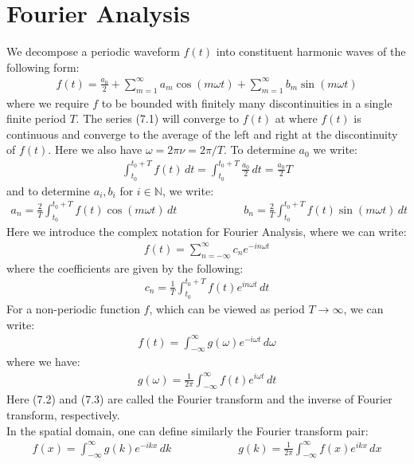 \documentclass[11pt]{book}
\theoremstyle{break}
\theoremstyle{break}
\newcommand{\N}{\mathbb{N}}
\begin{document}
\section[Fourier Analysis]{\color{red} Fourier Analysis \color{black}}
We decompose a periodic waveform $f(t)$ into constituent harmonic waves of the following form:
\begin{align}
f(t) = \frac{a_0}{2} + \sum_{m=1}^\infty a_m \cos(m\omega t) + \sum_{m=1}^\infty b_m \sin(m\omega t)
\end{align}
where we require $f$ to be bounded with finitely many discontinuities in a single finite period $T$. The series (7.1) will converge to $f(t)$ at where $f(t)$ is continuous and converge to the average of the left and right at the discontinuity of $f(t)$. Here we also have $\omega = 2\pi \nu = 2\pi/T$. To determine $a_0$ we write:
\begin{align*}
\int_{t_0}^{t_0+T}f(t)\, dt = \int_{t_0}^{t_0+T}\frac{a_0}{2}\, dt = \frac{a_0}{2}T
\end{align*}
and to determine $a_i,b_i$ for $i \in \N$, we write:
\begin{align*}
a_n = \frac{2}{T}\int_{t_0}^{t_0 + T}f(t) \cos(m\omega t) \, dt \qquad\qquad\qquad b_n = \frac{2}{T}\int_{t_0}^{t_0+T}f(t) \sin(m\omega t)\, dt
\end{align*}
Here we introduce the complex notation for Fourier Analysis, where we can write:
\begin{align*}
f(t) = \sum_{n=-\infty}^\infty c_n e^{-in \omega t}
\end{align*}
where the coefficients are given by the following:
\begin{align*}
c_n = \frac{1}{T}\int_{t_0}^{t_0+T} f(t) e^{in \omega t}\, dt
\end{align*}
For a non-periodic function $f$, which can be viewed as period $T \to \infty$, we can write:
\begin{align}
f(t) = \int_{-\infty}^\infty g(\omega) e^{-i\omega t}\,d\omega
\end{align}
where we have:
\begin{align}
g(\omega) = \frac{1}{2\pi}\int_{-\infty}^\infty f(t)e^{i\omega t}\, dt
\end{align}
Here (7.2) and (7.3) are called the Fourier transform and the inverse of Fourier transform, respectively.\\

In the spatial domain, one can define similarly the Fourier transform pair:
\begin{align*}
f(x)  = \int_{-\infty}^\infty g(k) e^{-ik x}\, dk \qquad\qquad\qquad g(k) = \frac{1}{2\pi}\int_{-\infty}^\infty f(x) e^{ikx}\, dx
\end{align*}
\end{document}
